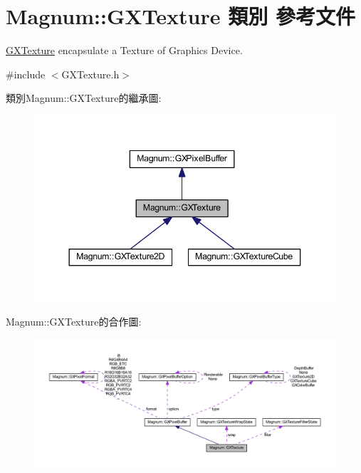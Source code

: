 \hypertarget{class_magnum_1_1_g_x_texture}{}\section{Magnum\+:\+:G\+X\+Texture 類別 參考文件}
\label{class_magnum_1_1_g_x_texture}


\hyperlink{class_magnum_1_1_g_x_texture}{G\+X\+Texture} encapsulate a Texture of Graphics Device.  




{\ttfamily \#include $<$G\+X\+Texture.\+h$>$}



類別\+Magnum\+:\+:G\+X\+Texture的繼承圖\+:\nopagebreak
\begin{figure}[H]
\begin{center}
\leavevmode
\includegraphics[width=344pt]{class_magnum_1_1_g_x_texture__inherit__graph}
\end{center}
\end{figure}


Magnum\+:\+:G\+X\+Texture的合作圖\+:\nopagebreak
\begin{figure}[H]
\begin{center}
\leavevmode
\includegraphics[width=350pt]{class_magnum_1_1_g_x_texture__coll__graph}
\end{center}
\end{figure}
